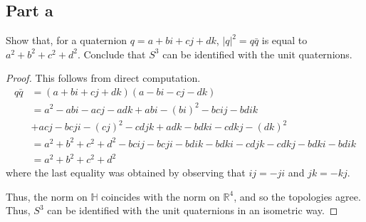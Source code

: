 \documentclass[fontsize=11pt]{scrartcl} %
\numberwithin{equation}{section} %
\numberwithin{figure}{section} %
\numberwithin{table}{section} %
\newcommand{\R}{\mathbb{R}}
\begin{document}
\subsection*{Part a}
Show that, for a quaternion $q=a+bi+cj+dk$, $|q|^2 = q\bar{q}$ is equal to
$a^2+b^2+c^2+d^2$. Conclude that $S^3$ can be identified with the unit
quaternions.
\\
\begin{proof}
This follows from direct computation.
    \[
        \begin{aligned}
            q\bar{q} &= (a+bi+cj+dk)(a-bi-cj-dk)\\
                    &=a^2-abi-acj-adk+abi-(bi)^2-bcij-bdik\\
                    &+acj-bcji-(cj)^2-cdjk+adk-bdki-cdkj-(dk)^2\\
                    &=a^2+b^2+c^2+d^2-bcij-bcji-bdik-bdki-cdjk-cdkj-bdki-bdik\\
                    &=a^2+b^2+c^2+d^2
        \end{aligned}
    \]
    where the last equality was obtained by observing that $ij=-ji$ and
    $jk=-kj$.

    Thus, the norm on $\mathbb{H}$ coincides with the norm on $\R^4$, and so
    the topologies agree. Thus, $S^3$ can be identified with the unit
    quaternions in an isometric way.
\end{proof}
\end{document}
